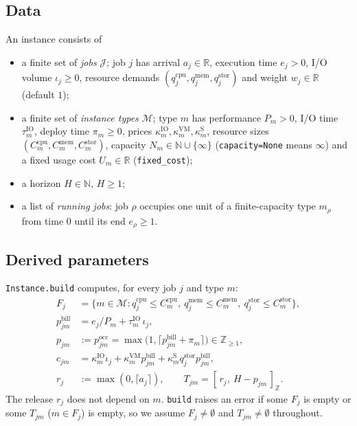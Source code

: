 \documentclass[11pt,a4paper]{article}
\newcommand{\J}{\mathcal{J}}
\newcommand{\M}{\mathcal{M}}
\newcommand{\Z}{\mathbb{Z}}
\newcommand{\N}{\mathbb{N}}
\newcommand{\R}{\mathbb{R}}
\newcommand{\code}[1]{\texttt{#1}}
\begin{document}
\subsection{Data}

An instance consists of
\begin{itemize}[nosep]
  \item a finite set of \emph{jobs} $\J$; job $j$ has arrival $a_j\in\R$,
    execution time $e_j>0$, I/O volume $\iota_j\ge 0$, resource demands
    $(q^{\mathrm{cpu}}_j,q^{\mathrm{mem}}_j,q^{\mathrm{stor}}_j)$ and weight
    $w_j\in\R$ (default $1$);
  \item a finite set of \emph{instance types} $\M$; type $m$ has performance
    $P_m>0$, I/O time $\tau^{\mathrm{IO}}_m$, deploy time $\pi_m\ge0$, prices
    $\kappa^{\mathrm{IO}}_m,\kappa^{\mathrm{VM}}_m,\kappa^{\mathrm{S}}_m$,
    resource sizes $(C^{\mathrm{cpu}}_m,C^{\mathrm{mem}}_m,C^{\mathrm{stor}}_m)$,
    capacity $N_m\in\N\cup\{\infty\}$ (\code{capacity=None} means $\infty$)
    and a fixed usage cost $U_m\in\R$ (\code{fixed\_cost});
  \item a horizon $H\in\N$, $H\ge1$;
  \item a list of \emph{running jobs}: job $\rho$ occupies one unit of a
    finite-capacity type $m_\rho$ from time $0$ until its end
    $e_\rho\ge1$.
\end{itemize}

\subsection{Derived parameters}

\code{Instance.build} computes, for every job $j$ and type $m$:
\begin{align}
F_j &= \{m\in\M : q^{\mathrm{cpu}}_j\le C^{\mathrm{cpu}}_m,\ q^{\mathrm{mem}}_j\le C^{\mathrm{mem}}_m,\ q^{\mathrm{stor}}_j\le C^{\mathrm{stor}}_m\}, \tag{eq.\,1}\\
p^{\mathrm{bill}}_{jm} &= e_j/P_m + \tau^{\mathrm{IO}}_m\,\iota_j, \tag{eq.\,2}\\
p_{jm} &:= p^{\mathrm{occ}}_{jm} = \max\bigl(1,\lceil p^{\mathrm{bill}}_{jm}+\pi_m\rceil\bigr)\in\Z_{\ge1}, \tag{eq.\,3}\\
c_{jm} &= \kappa^{\mathrm{IO}}_m\iota_j + \kappa^{\mathrm{VM}}_m p^{\mathrm{bill}}_{jm} + \kappa^{\mathrm{S}}_m q^{\mathrm{stor}}_j p^{\mathrm{bill}}_{jm}, \tag{eq.\,4}\\
r_j &:= \max(0,\lceil a_j\rceil),\qquad T_{jm} = [\,r_j,\ H-p_{jm}\,]_\Z. \tag{eq.\,5}
\end{align}
The release $r_j$ does not depend on $m$. \code{build} raises an error if some
$F_j$ is empty or some $T_{jm}$ ($m\in F_j$) is empty, so we assume
$F_j\ne\emptyset$ and $T_{jm}\neq\emptyset$ throughout.
\end{document}

